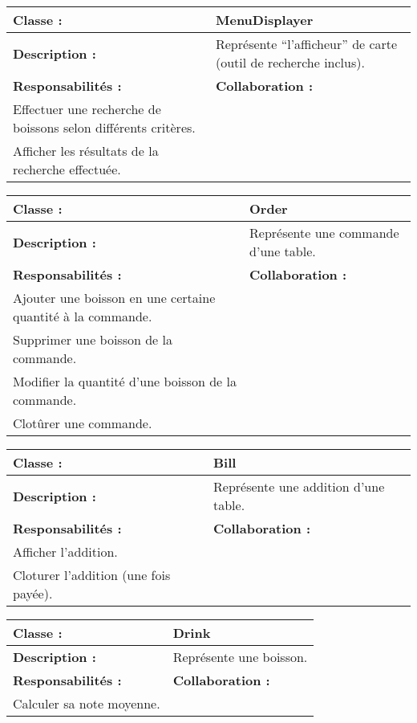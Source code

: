 \begin{center}
\vspace{0.5cm}

\begin{tabular}{|p{6cm}p{6cm}|}
	\hline
		\textbf{Classe :} & MenuDisplayer \\
	\hline
		\textbf{Description :} & Représente ``l'afficheur'' de carte (outil de recherche
		inclus). \\
	\hline
		\textbf{Responsabilités :} & \textbf{Collaboration :} \\
		Effectuer une recherche de boissons selon
		différents critères. &  \\
		Afficher les résultats de la recherche effectuée. & \\
	\hline		
\end{tabular}

\vspace{0.5cm}

\begin{tabular}{|p{6cm}p{6cm}|}
	\hline
		\textbf{Classe :} & Order \\
	\hline
		\textbf{Description :} & Représente une commande d'une table. \\
	\hline
		\textbf{Responsabilités :} & \textbf{Collaboration :} \\
		Ajouter une boisson en une certaine quantité à la commande. & \\
		Supprimer une boisson de la commande. & \\
		Modifier la quantité d'une boisson de la commande. & \\
		Clotûrer une commande. & \\
	\hline		
\end{tabular}

\vspace{0.5cm}

\begin{tabular}{|p{6cm}p{6cm}|}
	\hline
		\textbf{Classe :} & Bill \\
	\hline
		\textbf{Description :} & Représente une addition d'une table. \\
	\hline
		\textbf{Responsabilités :} & \textbf{Collaboration :} \\
		Afficher l'addition. & \\
		Cloturer l'addition (une fois payée). & \\
	\hline		
\end{tabular}

\vspace{0.5cm}

\begin{tabular}{|p{6cm}p{6cm}|}
	\hline
		\textbf{Classe :} & Drink \\
	\hline
		\textbf{Description :} & Représente une boisson. \\
	\hline
		\textbf{Responsabilités :} & \textbf{Collaboration :} \\
		Calculer sa note moyenne. & \\
	\hline		
\end{tabular}

\vspace{0.5cm}

\end{center}

